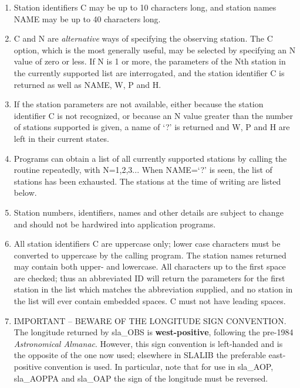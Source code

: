 \documentclass[11pt,twoside,nolof]{starlink}
\begin{document}
{
 \begin{enumerate}
  \item Station identifiers C may be up to 10 characters long,
        and station names NAME may be up to 40 characters long.
  \item C and N are \textit{alternative}\/ ways of specifying the observing
        station.  The C option, which is the most generally useful,
        may be selected by specifying an N value of zero or less.
        If N is 1 or more, the parameters of the Nth station
        in the currently supported list are interrogated, and
        the station identifier C is returned as well as NAME, W,
        P and H.
  \item If the station parameters are not available, either because
        the station identifier C is not recognized, or because an
        N value greater than the number of stations supported is
        given, a name of `?' is returned and W, P and H are left in
        their current states.
  \item Programs can obtain a list of all currently supported
        stations by calling the routine repeatedly, with N=1,2,3...
        When NAME=`?' is seen, the list of stations has been
        exhausted.  The stations at the time of writing are listed
        below.
  \item Station numbers, identifiers, names and other details are
        subject to change and should not be hardwired into
        application programs.
  \item All station identifiers C are uppercase only;  lower case
        characters must be converted to uppercase by the calling
        program.  The station names returned may contain both upper-
        and lowercase.  All characters up to the first space are
        checked;  thus an abbreviated ID will return the parameters
        for the first station in the list which matches the
        abbreviation supplied, and no station in the list will ever
        contain embedded spaces.  C must not have leading spaces.
  \item IMPORTANT -- BEWARE OF THE LONGITUDE SIGN CONVENTION.  The
        longitude returned by sla\_OBS is
        \textbf{west-positive}, following the pre-1984 \textit{Astronomical
        Almanac}.  However, this sign convention is left-handed and is
        the opposite of the one now used; elsewhere in
        SLALIB the preferable east-positive convention is used.  In
        particular, note that for use in sla\_AOP, sla\_AOPPA and
        sla\_OAP the sign of the longitude must be reversed.

\end{enumerate}}
\end{document}
